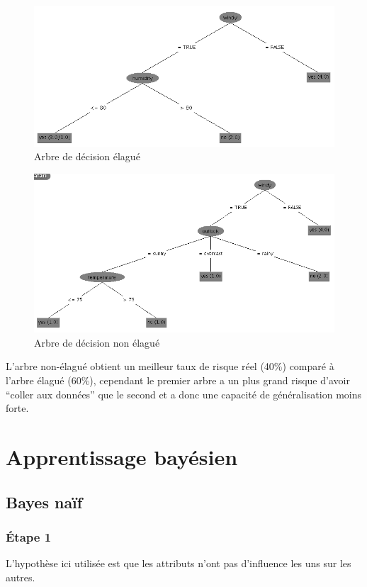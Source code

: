 \documentclass[a4paper,12pt]{article}
\begin{document}
\begin{figure}
	\center
	\includegraphics[width=1\textwidth]{arbre-elague.png}
	\caption{Arbre de décision élagué}
	\label{fig:arbre-elague}
\end{figure}
\begin{figure}
	\center
	\includegraphics[width=1\textwidth]{arbre-non-elague.png}
	\caption{Arbre de décision non élagué}
	\label{fig:arbre-non-elague}
\end{figure}
L’arbre non-élagué obtient un meilleur taux de risque réel (40\%) comparé à l’arbre élagué (60\%), cependant le premier arbre a un plus grand risque d'avoir \enquote{coller aux données} que le second et a donc une capacité de généralisation moins forte.

\section{Apprentissage bayésien}


\subsection{Bayes naïf}

\subsubsection*{\'Etape 1}
L'hypothèse ici utilisée est que les attributs n'ont pas d'influence les uns sur les autres.
\end{document}
